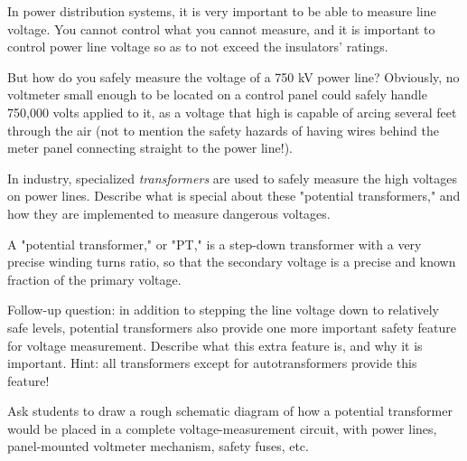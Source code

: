 

In power distribution systems, it is very important to be able to measure line voltage.  You cannot control what you cannot measure, and it is important to control power line voltage so as to not exceed the insulators' ratings.

But how do you safely measure the voltage of a 750 kV power line?  Obviously, no voltmeter small enough to be located on a control panel could safely handle 750,000 volts applied to it, as a voltage that high is capable of arcing several feet through the air (not to mention the safety hazards of having wires behind the meter panel connecting straight to the power line!).

In industry, specialized {\it transformers} are used to safely measure the high voltages on power lines.  Describe what is special about these "potential transformers," and how they are implemented to measure dangerous voltages.







A "potential transformer," or "PT," is a step-down transformer with a very precise winding turns ratio, so that the secondary voltage is a precise and known fraction of the primary voltage.

\vskip 10pt

Follow-up question: in addition to stepping the line voltage down to relatively safe levels, potential transformers also provide one more important safety feature for voltage measurement.  Describe what this extra feature is, and why it is important.  Hint: all transformers except for autotransformers provide this feature!







Ask students to draw a rough schematic diagram of how a potential transformer would be placed in a complete voltage-measurement circuit, with power lines, panel-mounted voltmeter mechanism, safety fuses, etc.  




